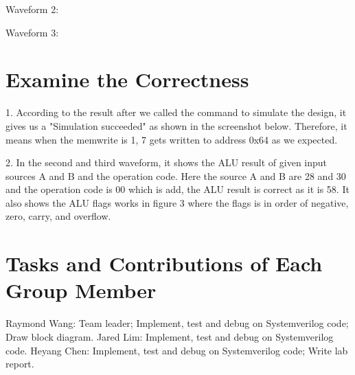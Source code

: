 \documentclass{article}
\begin{document}
Waveform 2:
\newline
\newline

Waveform 3:
\newline
\newline



\section{Examine the Correctness}

1. According to the result after we called the command to simulate the design, it gives us a "Simulation succeeded" as shown in the screenshot below. Therefore, it means when the memwrite is 1, 7 gets written to address 0x64 as we expected.
\newline

2. In the second and third waveform, it shows the ALU result of given input sources A and B and the operation code. Here the source A and B are 28 and 30 and the operation code is 00 which is add, the ALU result is correct as it is 58. It also shows the ALU flags works in figure 3 where the flags is in order of negative, zero, carry, and overflow.

\section{Tasks and Contributions of Each Group Member}

Raymond Wang: Team leader; Implement, test and debug on Systemverilog code; Draw block diagram.
\newline
Jared Lim: Implement, test and debug on Systemverilog code.
\newline
Heyang Chen: Implement, test and debug on Systemverilog code; Write lab report.
\end{document}
